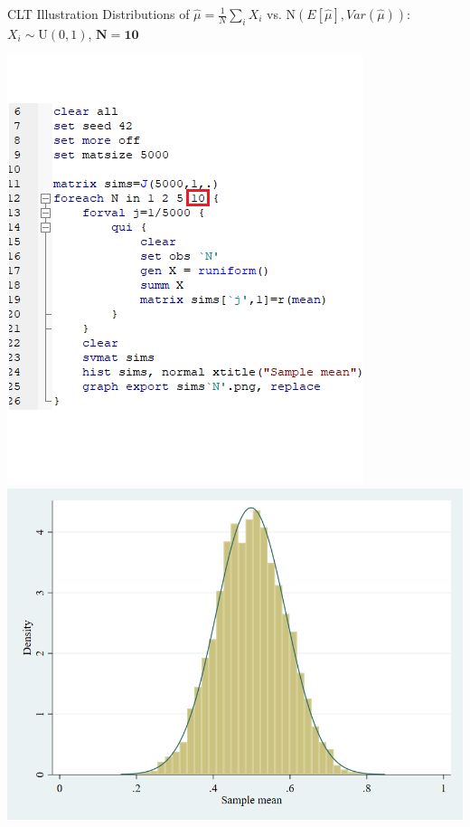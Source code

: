 \documentclass[11pt,english,handout]{beamer}
\begin{document}
\begin{frame}{CLT Illustration}
	\vspace{0.2cm}
	Distributions of $\hat{\mu}=\frac{1}{N}\sum_i X_i$ vs. $\mathrm{N}(E[\hat\mu],Var(\hat{\mu}))$: $X_i\sim \mathrm{U}(0,1)$, $\mathbf{N=10}$
	
	\begin{center}
		\includegraphics[scale=0.4]{Stata4.png} \includegraphics[scale=0.25]{sims10.png}
	\end{center}
	
\end{frame}
\end{document}
